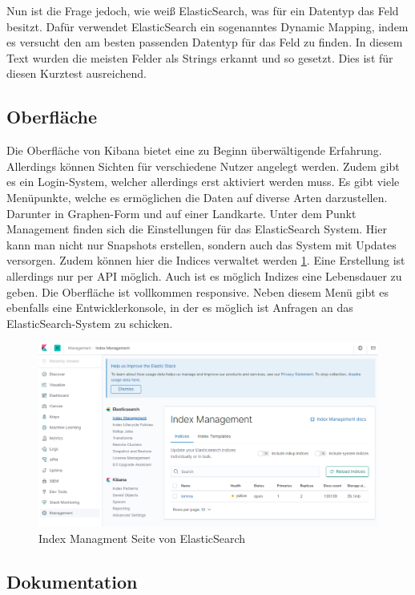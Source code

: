 Nun ist die Frage jedoch, wie weiß ElasticSearch, was für ein Datentyp das Feld besitzt. Dafür verwendet ElasticSearch ein sogenanntes Dynamic Mapping, indem es versucht den am besten passenden Datentyp für das Feld zu finden. In diesem Text wurden die meisten Felder als Strings erkannt und so gesetzt. Dies ist für diesen Kurztest ausreichend. 

\subsection{Oberfläche}

Die Oberfläche von Kibana bietet eine zu Beginn überwältigende Erfahrung. Allerdings können Sichten für verschiedene Nutzer angelegt werden. Zudem gibt es ein Login-System, welcher allerdings erst aktiviert werden muss. Es gibt viele Menüpunkte, welche es ermöglichen die Daten auf diverse Arten darzustellen. Darunter in Graphen-Form und auf einer Landkarte. Unter dem Punkt Management finden sich die Einstellungen für das ElasticSearch System. Hier kann man nicht nur Snapshots erstellen, sondern auch das System mit Updates versorgen. Zudem können hier die Indices verwaltet werden \ref{img:elasticInterface}. Eine Erstellung ist allerdings nur per API möglich. Auch ist es möglich Indizes eine Lebensdauer zu geben. Die Oberfläche ist vollkommen responsive. Neben diesem Menü gibt es ebenfalls eine Entwicklerkonsole, in der es möglich ist Anfragen an das ElasticSearch-System zu schicken. 


\begin{figure}
	\centering
	\includegraphics[width=1\linewidth]{images/elastic_ui.png}
	\caption{Index Managment Seite von ElasticSearch}
	\label{img:elasticInterface}
\end{figure}


\subsection{Dokumentation}



